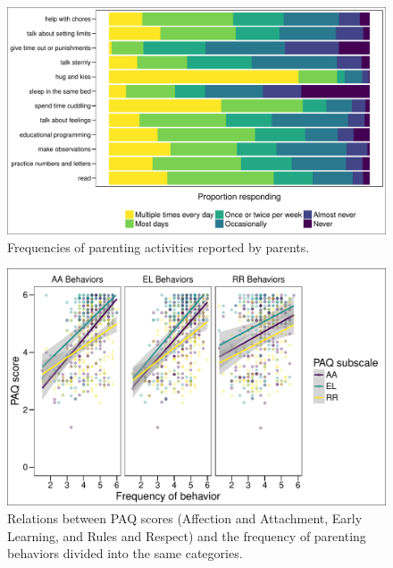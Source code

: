 \documentclass[floatsintext,man]{apa6}
\theoremstyle{definition}
\theoremstyle{definition}
\theoremstyle{definition}
\theoremstyle{remark}
\begin{document}
\begin{figure}
\centering
\includegraphics{PAQ_paper_files/figure-latex/behavefreq-1.pdf}
\caption{\label{fig:behavefreq}Frequencies of parenting activities reported
by parents.}
\end{figure}

\begin{figure}
\centering
\includegraphics{PAQ_paper_files/figure-latex/behavepaq-1.pdf}
\caption{\label{fig:behavepaq}Relations between PAQ scores (Affection and
Attachment, Early Learning, and Rules and Respect) and the frequency of
parenting behaviors divided into the same categories.}
\end{figure}
\end{document}
